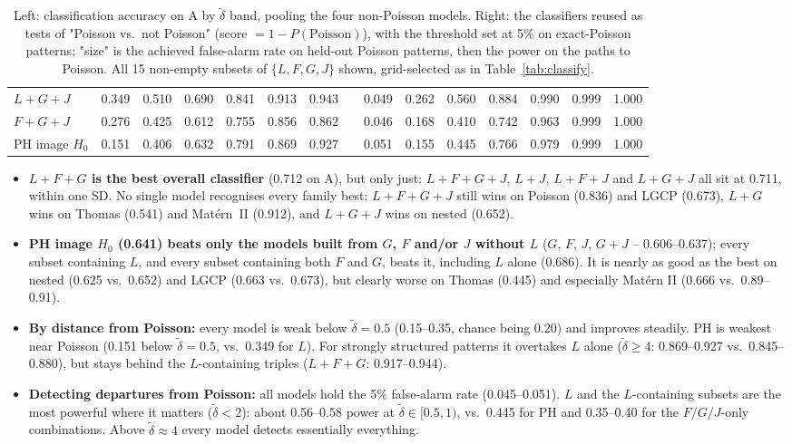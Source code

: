 \documentclass[10pt,a4paper]{article}
\newcommand{\dtil}{\tilde\delta}
\begin{document}
\begin{table}[ht]
\begin{tabular}{@{}l cccccc c c cccccc@{}}
$L{+}G{+}J$ & 0.349 & 0.510 & 0.690 & 0.841 & 0.913 & 0.943 & & 0.049 & 0.262 & 0.560 & 0.884 & 0.990 & 0.999 & 1.000\\
$F{+}G{+}J$ & 0.276 & 0.425 & 0.612 & 0.755 & 0.856 & 0.862 & & 0.046 & 0.168 & 0.410 & 0.742 & 0.963 & 0.999 & 1.000\\
PH image $H_0$ & 0.151 & 0.406 & 0.632 & 0.791 & 0.869 & 0.927 & & 0.051 & 0.155 & 0.445 & 0.766 & 0.979 & 0.999 & 1.000\\
\bottomrule
\end{tabular}
\caption{Left: classification accuracy on A by $\dtil$ band, pooling the four non-Poisson models. Right: the classifiers reused as tests of "Poisson vs.\ not Poisson" (score $=1-P(\text{Poisson})$), with the threshold set at 5\% on exact-Poisson patterns; "size" is the achieved false-alarm rate on held-out Poisson patterns, then the power on the paths to Poisson. All 15 non-empty subsets of $\{L,F,G,J\}$ shown, grid-selected as in Table~\ref{tab:classify}.}
\label{tab:classify-delta}
\end{table}

\begin{itemize}
  \item \textbf{$L{+}F{+}G$ is the best overall classifier} (0.712 on A), but only just: $L{+}F{+}G{+}J$, $L{+}J$, $L{+}F{+}J$ and $L{+}G{+}J$ all sit at 0.711, within one SD. No single model recognises every family best: $L{+}F{+}G{+}J$ still wins on Poisson (0.836) and LGCP (0.673), $L{+}G$ wins on Thomas (0.541) and Mat\'ern~II (0.912), and $L{+}G{+}J$ wins on nested (0.652).
  \item \textbf{PH image $H_0$ (0.641) beats only the models built from $G$, $F$ and/or $J$ without $L$} ($G$, $F$, $J$, $G{+}J$ -- 0.606--0.637); every subset containing $L$, and every subset containing both $F$ and $G$, beats it, including $L$ alone (0.686). It is nearly as good as the best on nested (0.625 vs.\ 0.652) and LGCP (0.663 vs.\ 0.673), but clearly worse on Thomas (0.445) and especially Mat\'ern II (0.666 vs.\ 0.89--0.91).
  \item \textbf{By distance from Poisson:} every model is weak below $\dtil = 0.5$ (0.15--0.35, chance being 0.20) and improves steadily. PH is weakest near Poisson (0.151 below $\dtil=0.5$, vs.\ 0.349 for $L$). For strongly structured patterns it overtakes $L$ alone ($\dtil \ge 4$: 0.869--0.927 vs.\ 0.845--0.880), but stays behind the $L$-containing triples ($L{+}F{+}G$: 0.917--0.944).
  \item \textbf{Detecting departures from Poisson:} all models hold the 5\% false-alarm rate (0.045--0.051). $L$ and the $L$-containing subsets are the most powerful where it matters ($\dtil < 2$): about 0.56--0.58 power at $\dtil\in[0.5,1)$, vs.\ 0.445 for PH and 0.35--0.40 for the $F/G/J$-only combinations. Above $\dtil \approx 4$ every model detects essentially everything.
\end{itemize}
\end{document}
